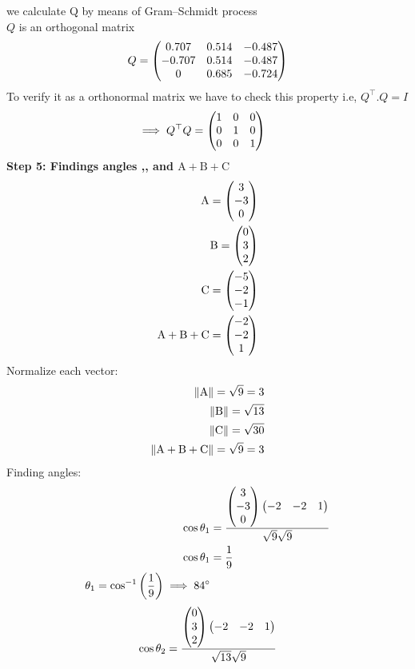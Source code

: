\documentclass[11pt]{book}
\begin{document}
\begin{enumerate}
we calculate Q by means of Gram–Schmidt process\\
$Q$ is an orthogonal matrix 
\begin{align*}
    Q=\begin{pmatrix} 0.707&0.514&-0.487\\-0.707&0.514&-0.487\\0&0.685&-0.724\end{pmatrix}
\end{align*}
To verify it as a orthonormal matrix we have to check this property i.e,  $Q^{\top}.Q =I$
\begin{align*}
    \implies Q^\top Q &= \begin{pmatrix}1&0&0\\0&1&0\\0&0&1\end{pmatrix}
\end{align*}
\textbf{Step 5: Findings angles ,, and $\text{A}+\text{B}+\text{C} $}
\begin{align}
    \text{A}=\begin{pmatrix}3 \\-3 \\0\end{pmatrix}\\
    \text{B}=\begin{pmatrix}0\\ 3\\ 2\end{pmatrix}  \\
    \text{C}=\begin{pmatrix}-5\\-2\\ -1\end{pmatrix}\\
    \text{A}+\text{B}+\text{C}=\begin{pmatrix}-2\\-2\\ 1\end{pmatrix}\\
\end{align}
Normalize each vector:\\
   \begin{align}
    \left\lVert\text{A}\right\rVert=\sqrt{9}=3\\
    \left\lVert\text{B}\right\rVert=\sqrt{13}\\
     \left\lVert\text{C}\right\rVert=\sqrt{30}\\
     \left\lVert\text{A}+\text{B}+\text{C}\right\rVert=\sqrt{9}=3
   \end{align}
Finding angles:
\begin{align}
    \cos{\theta_1}&=\frac{\begin{pmatrix}3 \\-3 \\0\end{pmatrix}\begin{pmatrix}-2&-2&1\end{pmatrix}}{\sqrt{9}\sqrt{9}}\\
    \cos{\theta_1}&=\frac{1}{9}\\
    \theta_1=\cos^{-1}\left(\frac{1}{9}\right)
    \implies 84\degree
\end{align}
\begin{align}
    \cos{\theta_2}&=\frac{\myvec{0 \\3 \\2}\myvec{-2&-2&1}}{\sqrt{13}\sqrt{9}}\\

\end{align}
\end{enumerate}
\end{document}

